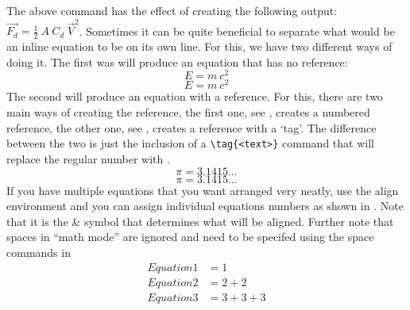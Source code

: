 		The above command has the effect of creating the following output: \(\vec{F_{d}}=\frac{1}{2}\ A\ C_{d}\ \vec{V}^{2}\).
		Sometimes it can be quite beneficial to separate what would be an inline equation to be on its own line. 
		For this, we have two different ways of doing it. 
		The first was will produce an equation that has no reference:
		\[
			E = m\ c^2
		\] %
		\begin{equation*}
			E = m\ c^2
		\end{equation*}
		The second will produce an equation with a reference. 
		For this, there are two main ways of creating the reference, the first one, see , creates a numbered reference, the other one, see , creates a reference with a `tag'. 
		The difference between the two is just the inclusion of a \lstinline|\tag{<text>}| command that will replace the regular number with .
		\begin{equation}
			\label{eq:Eq}
			\pi = 3.1415...
		\end{equation}
		\begin{equation}
			\tag{Constant pi}
			\label{eq:customTag}
			\pi = 3.1415...
		\end{equation}
		If you have multiple equations that you want arranged very neatly, use the align environment and you can assign individual equations numbers as shown in .
		Note that it is the \& symbol that determines what will be aligned.
		Further note that spaces in \enquote{math mode} are ignored and need to be specifed using the space commands in %
		\begin{align}%
			\label{eq:multiref:a} Equation1 & = 1\\
			\label{eq:multiref:b} Equation2 & = 2 + 2\\
			\label{eq:multiref:c} Equation3 & = 3 + 3 + 3
		\end{align}
		

